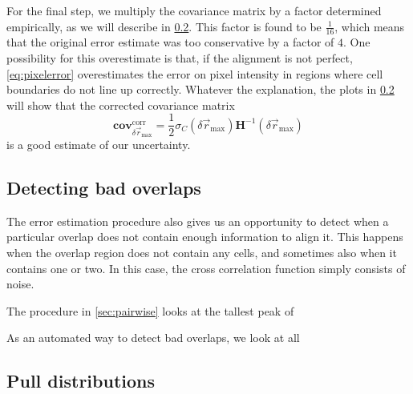 \documentclass{article}
\newcommand{\matrixbold}[1]{\mathbf{#1}}
\begin{document}
For the final step, we multiply the covariance matrix by a factor determined empirically, as we will describe in \cref{sec:pulls}.  This factor is found to be $\frac{1}{16}$, which means that the original error estimate was too conservative by a factor of $4$.  One possibility for this overestimate is that, if the alignment is not perfect, \cref{eq:pixelerror} overestimates the error on pixel intensity in regions where cell boundaries do not line up correctly.  Whatever the explanation, the plots in \cref{sec:pulls} will show that the corrected covariance matrix
\begin{equation}
\matrixbold{cov}_{\delta\vec{r}_\text{max}}^\text{corr}=\frac{1}{2}\sigma_C(\delta\vec{r}_\text{max})\matrixbold{H}^{-1}(\delta\vec{r}_\text{max})
\end{equation}
is a good estimate of our uncertainty.

\subsection{Detecting bad overlaps}

The error estimation procedure also gives us an opportunity to detect when a particular overlap does not contain enough information to align it.  This happens when the overlap region does not contain any cells, and sometimes also when it contains one or two.  In this case, the cross correlation function simply consists of noise.

The procedure in \cref{sec:pairwise} looks at the tallest peak of 

As an automated way to detect bad overlaps, we look at all 

\subsection{Pull distributions}
\label{sec:pulls}
\end{document}
